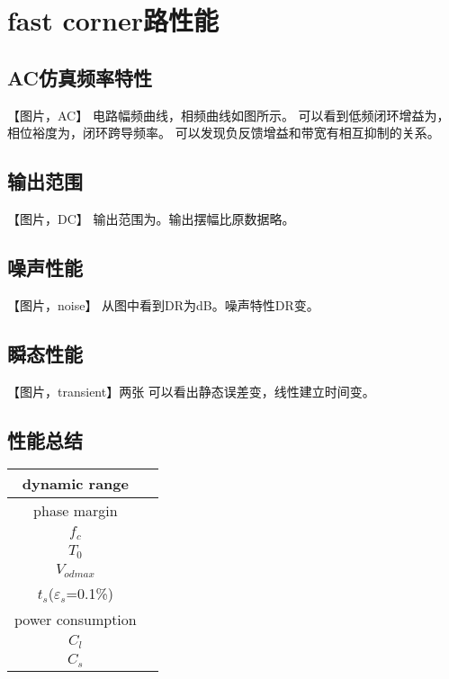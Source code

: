 \documentclass[a4paper]{article}
\begin{document}
\section{fast corner路性能}
\subsection{AC仿真频率特性}
【图片，AC】
电路幅频曲线，相频曲线如图所示。
可以看到低频闭环增益为，相位裕度为，闭环跨导频率。
可以发现负反馈增益和带宽有相互抑制的关系。
\newpage
\subsection{输出范围}
【图片，DC】
输出范围为。输出摆幅比原数据略。
\newpage
\subsection{噪声性能}
【图片，noise】
从图中看到DR为dB。噪声特性DR变。
\newpage
\subsection{瞬态性能}
【图片，transient】两张
可以看出静态误差变，线性建立时间变。
\newpage
\subsection{性能总结}
\begin{table}[htbp]
    \begin{tabular}{|c|c|}
        \hline
        dynamic range&\\
        \hline
        phase margin&\\
        \hline
        $f_c$ &\\
        \hline 
        $T_0$&\\
        \hline
        $V_{odmax}$&\\
        \hline
        $t_s$($\varepsilon_s$=0.1\%)&\\
        \hline
        power consumption&\\
        \hline
        $C_l$&\\
        \hline
        $C_s$&\\
        \hline
    \end{tabular}
\end{table}
\end{document}

